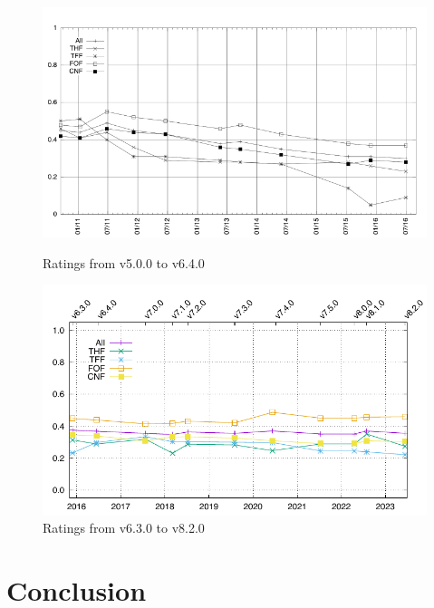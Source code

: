 \documentclass[runningheads]{llncs}
\begin{document}
\begin{figure}[h!]
\centering
\begin{minipage}[t]{.49\textwidth}
  \centering
  \includegraphics[width=\textwidth]{Plots/RatingsDecline_v5.0.0_v6.4.0.pdf}
  \vspace*{-2em}
  \caption{Ratings from v5.0.0 to v6.4.0}
  \label{Ratings_v5.0.0_v6.4.0}
\end{minipage}
\begin{minipage}[t]{.49\textwidth}
  \centering
  \includegraphics[width=\textwidth]{Plots/RatingsDecline_v6.3.0_v8.2.0.pdf}
  \vspace*{-2em}
  \caption{Ratings from v6.3.0 to v8.2.0}
  \label{Ratings_v6.3.0_v8.2.0}
\end{minipage}
\end{figure}

\section{Conclusion}
\label{Conclusion}
\end{document}
